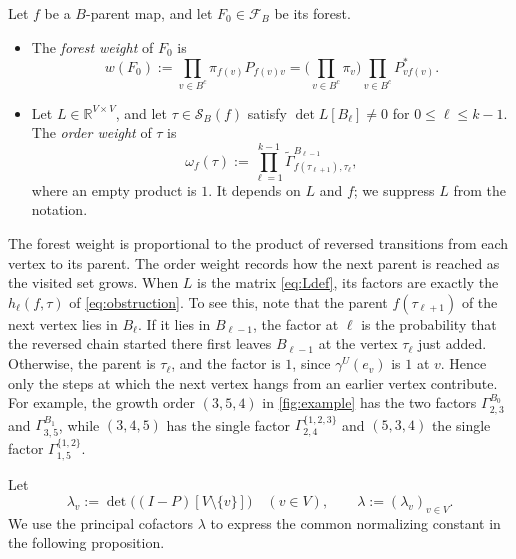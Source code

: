 \documentclass[onefignum,onetabnum,nohypdvips]{siamart250211}
\numberwithin{theorem}{section}
\numberwithin{equation}{section}
\newcommand{\Orders}{\mathcal{S}}
\newcommand{\Fset}{\mathcal{F}}
\newcommand{\R}{\mathbb{R}}
\begin{document}
\begin{definition}\label{def:weight}
Let $f$ be a $B$-parent map, and let $F_0\in\Fset_B$ be its forest.
\begin{itemize}
\item[(a)] The \emph{forest weight} of $F_0$ is
\begin{equation}\label{eq:forestweight}
w(F_0):=\prod_{v\in B^c}\pi_{f(v)}P_{f(v)v}
=\Big(\prod_{v\in B^c}\pi_v\Big)\prod_{v\in B^c}P^{*}_{vf(v)} .
\end{equation}
\item[(b)] Let $L\in\R^{V\times V}$, and let $\tau\in\Orders_B(f)$
satisfy $\det L[B_\ell]\ne0$ for $0\le \ell\le k-1$. The \emph{order
weight} of $\tau$ is
\begin{equation}\label{eq:weight}
\omega_f(\tau):=\prod_{\ell=1}^{k-1}\tilde\Gamma^{B_{\ell-1}}_{f(\tau_{\ell+1}),\tau_\ell},
\end{equation}
where an empty product is $1$. It depends on $L$ and $f$; we suppress
$L$ from the notation.
\end{itemize}
\end{definition}

The forest weight is proportional to the product of reversed
transitions from each vertex to its parent. The order weight records
how the next parent is reached as the visited set grows. When $L$ is
the matrix \eqref{eq:Ldef}, its factors are exactly the
$h_\ell(f,\tau)$ of \eqref{eq:obstruction}. To see this, note that the parent
$f(\tau_{\ell+1})$ of the next vertex lies in $B_\ell$. If it lies in
$B_{\ell-1}$, the factor at $\ell$ is the
probability that the reversed chain started there first leaves
$B_{\ell-1}$ at the vertex $\tau_\ell$ just added. Otherwise, the parent
is $\tau_\ell$, and the factor is $1$, since $\gamma^{U}(e_v)$ is $1$ at
$v$. Hence only the steps at which the next vertex hangs from an earlier
vertex contribute. For example, the growth order $(3,5,4)$ in
\cref{fig:example} has the two factors $\Gamma^{B_0}_{2,3}$ and
$\Gamma^{B_1}_{3,5}$, while $(3,4,5)$ has the single factor
$\Gamma^{\{1,2,3\}}_{2,4}$ and $(5,3,4)$ the single factor
$\Gamma^{\{1,2\}}_{1,5}$.

Let
\begin{equation}\label{eq:lam}
\lambda_v:=\det\big((I-P)[V\setminus\{v\}]\big)\quad(v\in V),
\qquad \lambda:=(\lambda_v)_{v\in V}.
\end{equation}
We use the principal cofactors $\lambda$ to express the common
normalizing constant in the following proposition.
\end{document}
